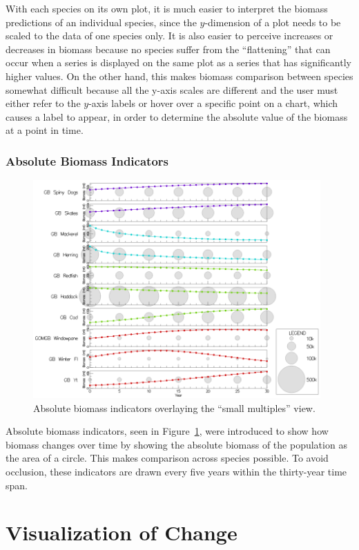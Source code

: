 With each species on its own plot, it is much easier to interpret the biomass predictions of an individual species, since the $y$-dimension of a plot needs to be scaled to the data of one species only.  It is also easier to perceive increases or decreases in biomass because no species suffer from the ``flattening'' that can occur when a series is displayed on the same plot as a series that has significantly higher values.  On the other hand, this makes biomass comparison between species somewhat difficult because all the y-axis scales are different and the user must either refer to the $y$-axis labels or hover over a specific point on a chart, which causes a label to appear, in order to determine the absolute value of the biomass at a point in time.

\subsubsection{Absolute Biomass Indicators}

\begin{figure}[h]
	\centering
	\includegraphics[width=11cm]{figures/png/msprod_abssize.png}
	\caption{Absolute biomass indicators overlaying the ``small multiples'' view.}
	\label{fig:msprod_abssize}
\end{figure}

Absolute biomass indicators, seen in Figure~\ref{fig:msprod_abssize}, were introduced to show how biomass changes over time by showing the absolute biomass of the population as the area of a circle.  This makes comparison across species possible.  To avoid occlusion, these indicators are drawn every five years within the thirty-year time span.

\section{Visualization of Change}

